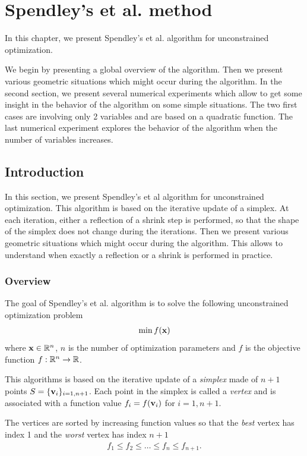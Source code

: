 \chapter{Spendley's et al. method}

In this chapter, we present Spendley's et al. algorithm \cite{Spendley1962} for 
unconstrained optimization.

We begin by presenting a global overview of the algorithm. 
Then we present various geometric situations which might occur
during the algorithm. In the second section, we present several 
numerical experiments which allow to get some insight in the behavior 
of the algorithm on some simple situations. The two first cases 
are involving only 2 variables and are based on a quadratic function.
The last numerical experiment explores the behavior of the algorithm 
when the number of variables increases.

\section{Introduction}

In this section, we present Spendley's et al algorithm for unconstrained optimization.
This algorithm is based on the iterative update of a simplex. 
At each iteration, either a reflection of a shrink step is performed, so that
the shape of the simplex does not change during the iterations.
Then we present various geometric situations which might occur
during the algorithm. This allows to understand when exactly a reflection 
or a shrink is performed in practice.

\subsection{Overview}

The goal of Spendley's et al. algorithm is to solve the 
following unconstrained optimization problem
\begin{eqnarray}
\min f(\mathbf{x})
\end{eqnarray}
where $\mathbf{x}\in \mathbb{R}^n$, $n$ is the number of optimization parameters and $f$ is the objective 
function $f:\mathbb{R}^n\rightarrow \mathbb{R}$.

This algorithms is based on the iterative update of 
a \emph{simplex} made of $n+1$ points $S=\{\mathbf{v}_i\}_{i=1,n+1}$. Each point 
in the simplex is called a \emph{vertex} and is associated with 
a function value $f_i=f(\mathbf{v}_i)$ for $i=1,n+1$.

The vertices are sorted by increasing function values so that the 
\emph{best} vertex has index 1 and the \emph{worst} vertex 
has index $n+1$
\begin{eqnarray}
\label{sp-sorted-vertices-fv}
f_1 \leq f_2 \leq \ldots \leq f_n \leq f_{n+1}.
\end{eqnarray}

